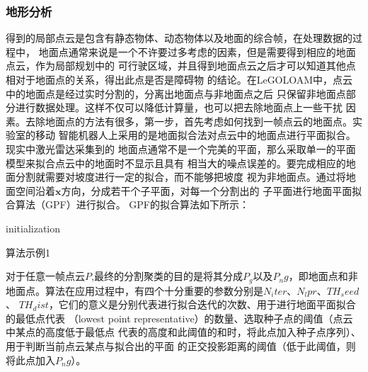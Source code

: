 \subsubsection{地形分析}
得到的局部点云是包含有静态物体、动态物体以及地面的综合帧，在处理数据的过程中，
地面点通常来说是一个不许要过多考虑的因素，但是需要得到相应的地面点云，作为局部规划中的
可行驶区域，并且得到地面点云之后才可以知道其他点相对于地面点的关系，得出此点是否是障碍物
的结论。在LeGO\-LOAM中，点云中的地面点是经过实时分割的，分离出地面点与非地面点之后
只保留非地面点部分进行数据处理。这样不仅可以降低计算量，也可以把去除地面点上一些干扰
因素。去除地面点的方法有很多，第一步，首先考虑如何找到一帧点云的地面点。实验室的移动
智能机器人上采用的是地面拟合法对点云中的地面点进行平面拟合。现实中激光雷达采集到的
地面点通常不是一个完美的平面，那么采取单一的平面模型来拟合点云中的地面时不显示且具有
相当大的噪点误差的。要完成相应的地面分割就需要对坡度进行一定的拟合，而不能够把坡度
视为非地面点。通过将地面空间沿着$\symbf{x}$方向，分成若干个子平面，对每一个分割出的
子平面进行地面平面拟合算法（GPF）进行拟合。
GPF的拟合算法如下所示：
\begin{algorithm}[ht]
    \SetAlgoLined
  
    initialization\;
    \caption{算法示例1}
    \label{algo:algorithm2}
  \end{algorithm}
对于任意一帧点云$P$,最终的分割聚类的目的是将其分成$P_g$以及$P_ng$，即地面点和非
地面点。算法在应用过程中，有四个十分重要的参数分别是$N_iter$、$N_lpr$、$TH_seed$、
$TH_dist$，它们的意义是分别代表进行拟合迭代的次数、用于进行地面平面拟合的最低点代表
（lowest point representative）的数量、选取种子点的阈值（点云中某点的高度低于最低点
代表的高度和此阈值的和时，将此点加入种子点序列）、用于判断当前点云某点与拟合出的平面
的正交投影距离的阈值（低于此阈值，则将此点加入$P_ng$）。

